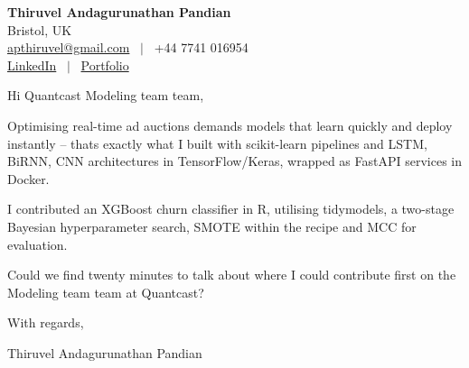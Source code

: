 \documentclass[11pt,a4paper]{article}
\begin{document}
\raggedright
\pagestyle{empty}

\begin{center}
    {\LARGE \color{linkblue} \textbf{Thiruvel Andagurunathan Pandian}}\\[0.2cm]
    Bristol, UK \\
    \href{mailto:apthiruvel@gmail.com}{apthiruvel@gmail.com} \ $|$ \ +44 7741 016954 \\
\href{https://www.linkedin.com/in/thiruvel-a-p/}{LinkedIn} \ $|$ \ \href{https://thiruvel-ap.github.io/PersonalPortfolio/}{Portfolio}
\end{center}

\vspace{0.4cm}

\noindent
Hi Quantcast Modeling team team,

Optimising real-time ad auctions demands models that learn quickly and deploy instantly – that\textquotesingle{}s exactly what I built with scikit-learn pipelines and LSTM, BiRNN, CNN architectures in TensorFlow/Keras, wrapped as FastAPI services in Docker.

I contributed an XGBoost churn classifier in R, utilising tidymodels, a two-stage Bayesian hyperparameter search, SMOTE within the recipe and MCC for evaluation.

Could we find twenty minutes to talk about where I could contribute first on the Modeling team team at Quantcast?

\vspace{0.5cm}

With regards,

Thiruvel Andagurunathan Pandian
\end{document}
